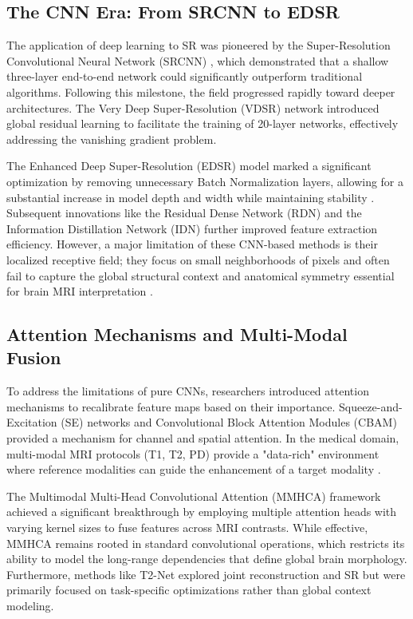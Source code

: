 \documentclass{IEEEoj}
\begin{document}
\subsection{The CNN Era: From SRCNN to EDSR}
The application of deep learning to SR was pioneered by the Super-Resolution Convolutional Neural Network (SRCNN) \cite{srcnn}, which demonstrated that a shallow three-layer end-to-end network could significantly outperform traditional algorithms. Following this milestone, the field progressed rapidly toward deeper architectures. The Very Deep Super-Resolution (VDSR) network \cite{vdsr} introduced global residual learning to facilitate the training of 20-layer networks, effectively addressing the vanishing gradient problem. 

The Enhanced Deep Super-Resolution (EDSR) model \cite{edsr} marked a significant optimization by removing unnecessary Batch Normalization layers, allowing for a substantial increase in model depth and width while maintaining stability \cite{rcan}. Subsequent innovations like the Residual Dense Network (RDN) \cite{rdn} and the Information Distillation Network (IDN) \cite{idn} further improved feature extraction efficiency. However, a major limitation of these CNN-based methods is their localized receptive field; they focus on small neighborhoods of pixels and often fail to capture the global structural context and anatomical symmetry essential for brain MRI interpretation \cite{seran, csn}.

\subsection{Attention Mechanisms and Multi-Modal Fusion}
To address the limitations of pure CNNs, researchers introduced attention mechanisms to recalibrate feature maps based on their importance. Squeeze-and-Excitation (SE) networks \cite{seran} and Convolutional Block Attention Modules (CBAM) provided a mechanism for channel and spatial attention. In the medical domain, multi-modal MRI protocols (T1, T2, PD) provide a "data-rich" environment where reference modalities can guide the enhancement of a target modality \cite{fscwrn, csn}.

The Multimodal Multi-Head Convolutional Attention (MMHCA) framework \cite{Georgescu2023} achieved a significant breakthrough by employing multiple attention heads with varying kernel sizes to fuse features across MRI contrasts. While effective, MMHCA remains rooted in standard convolutional operations, which restricts its ability to model the long-range dependencies that define global brain morphology. Furthermore, methods like T2-Net \cite{t2net} explored joint reconstruction and SR but were primarily focused on task-specific optimizations rather than global context modeling.
\end{document}
